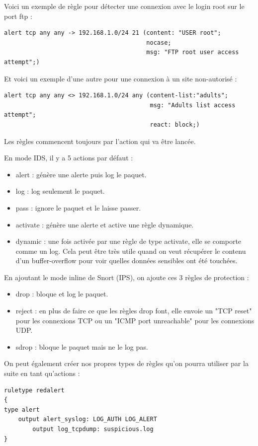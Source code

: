 \documentclass[a4paper,11pt,french]{article}
\begin{document}
Voici un exemple de règle pour détecter une connexion avec le login root sur le port ftp :
\begin{verbatim}
alert tcp any any -> 192.168.1.0/24 21 (content: "USER root"; 
                                        nocase; 
                                        msg: "FTP root user access attempt";)
\end{verbatim}

Et voici un exemple d’une autre pour une connexion à un site non-autorisé :
\begin{verbatim}
alert tcp any any <> 192.168.1.0/24 any (content-list:"adults"; 
                                         msg: "Adults list access attempt"; 
                                         react: block;)
\end{verbatim}

Les règles commencent toujours par l’action qui va être lancée.


En mode IDS, il y a 5 actions par défaut :
\begin{itemize}
\item alert : génère une alerte puis log le paquet.
\item log : log seulement le paquet.
\item pass : ignore le paquet et le laisse passer.
\item activate : génère une alerte et active une règle dynamique.
\item dynamic : une fois activée par une règle de type activate, elle se comporte comme un log. Cela peut être très utile quand on veut récupérer le contenu d’un buffer-overflow pour voir quelles données sensibles ont été touchées. 
\end{itemize}


En ajoutant le mode inline de Snort (IPS), on ajoute ces 3 règles de protection :
\begin{itemize}
\item drop : bloque et log le paquet.
\item reject : en plus de faire ce que les règles drop font, elle envoie un "TCP reset" pour les connexions TCP ou un "ICMP port unreachable" pour les connexions UDP. 
\item sdrop : bloque le paquet mais ne le log pas.
\end{itemize}

On peut également créer nos propres types de règles qu’on pourra utiliser par la suite en tant qu’actions :
\begin{Verbatim}
ruletype redalert
{
type alert 
 	output alert_syslog: LOG_AUTH LOG_ALERT 
    	output log_tcpdump: suspicious.log
}
\end{Verbatim}
\end{document}
